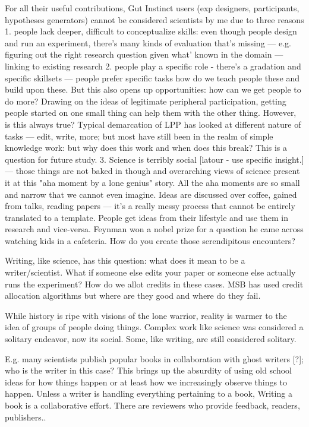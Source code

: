 For all their useful contributions, Gut Instinct users (exp designers, participants, hypotheses generators) cannot be considered scientists by me due to three reasons
1. people lack deeper, difficult to conceptualize skills:  even though people design and run an experiment, there’s many kinds of evaluation that’s missing — e.g. figuring out the right research question given what’ known in the domain — linking to existing research
2. people play a specific role - there’s a gradation and specific skillsets — people prefer specific tasks how do we teach people these and build upon these. But this also opens up opportunities:  how can we get people to do more? Drawing on the ideas of legitimate peripheral participation, getting people started on one small thing can help them with the other thing. However, is this always true? Typical demarcation of LPP has looked at different nature of tasks — edit, write, more; but most have still been in the realm of simple knowledge work: but why does this work and when does this break? This is a question for future study.
3. Science is terribly social [latour - use specific insight.] — those things are not baked in though and overarching views of science present it at this "aha moment by a lone genius" story. All the aha moments are so small and narrow that we cannot even imagine. Ideas are discussed over coffee, gained from talks, reading papers — it’s a really messy process that cannot be entirely translated to a template. People get ideas from their lifestyle and use them in research and vice-versa. Feynman won a nobel prize for a question he came across watching kids in a cafeteria. How do you create those serendipitous encounters?


Writing, like science, has this question: what does it mean to be a writer/scientist. What if someone else edits your paper or someone else actually runs the experiment? How do we allot credits in these cases. MSB has used credit allocation algorithms but where are they good and where do they fail. 

While history is ripe with visions of the lone warrior, reality is warmer to the idea of groups of people doing things. Complex work like science was considered a solitary endeavor, now its social. Some, like writing, are still considered solitary.

E.g. many scientists publish popular books in collaboration with ghost writers [?]; who is the writer in this case? This brings up the absurdity of using old school ideas for how things happen or at least how we increasingly observe things to happen. Unless a writer is handling everything pertaining to a book, Writing a book is a collaborative effort. There are reviewers who provide feedback, readers, publishers.. 

